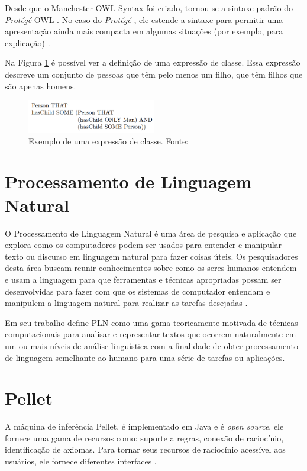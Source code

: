 \documentclass{bcc}
\begin{document}
Desde que o Manchester OWL Syntax foi criado, tornou-se a sintaxe padrão do \textit{Protégé} OWL \cite{horridge2006}. No caso do \textit{Protégé} \cite{noy2001}, ele estende a sintaxe para permitir uma apresentação ainda mais compacta em algumas situações (por exemplo, para explicação) \cite{horridge2009}.

Na Figura \ref{fig:manchester_exemplo} é possível ver a definição de uma expressão de classe. Essa expressão descreve um conjunto de pessoas que têm pelo menos um filho, que têm filhos que são apenas homens.

\begin{figure}[H]
\centering
\includegraphics[width=0.5\textwidth]{Figuras/manchester_exemplo.png}
\caption{Exemplo de uma expressão de classe. Fonte: \cite{horridge2006}}
\label{fig:manchester_exemplo}
\end{figure}

\section{Processamento de Linguagem Natural}

O Processamento de Linguagem Natural é uma área de pesquisa e aplicação que explora como os computadores podem ser usados para entender e manipular texto ou discurso em linguagem natural para fazer coisas úteis. Os pesquisadores desta área buscam reunir conhecimentos sobre como os seres humanos entendem e usam a linguagem para que ferramentas e técnicas apropriadas possam ser desenvolvidas para fazer com que os sistemas de computador entendam e manipulem a linguagem natural para realizar as tarefas desejadas \cite{chowdhury2003}.

Em seu trabalho \cite{liddy2001} define PLN como uma gama teoricamente motivada de técnicas computacionais para analisar e representar textos que ocorrem naturalmente em um ou mais níveis de análise linguística com a finalidade de obter processamento de linguagem semelhante ao humano para uma série de tarefas ou aplicações.

\section{Pellet}

A máquina de inferência Pellet, é implementado em Java e é \textit{open source}, ele fornece uma gama de recursos como: suporte a regras, conexão de raciocínio, identificação de axiomas. Para tornar seus recursos de raciocínio acessível aos usuários, ele fornece diferentes interfaces \cite{sirin2007}. 
\end{document}
